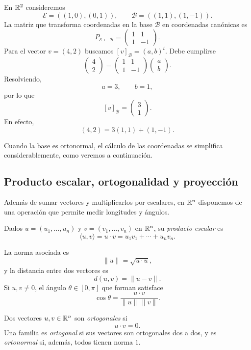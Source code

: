 \begin{example}
En $\mathbb{R}^2$ consideremos
\[
\mathcal E=((1,0),(0,1)),
\qquad
\mathcal B=((1,1),(1,-1)).
\]
La matriz que transforma coordenadas en la base $\mathcal B$ en coordenadas canónicas es
\[
P_{\mathcal E\leftarrow\mathcal B}
=
\begin{pmatrix}
1&1\\
1&-1
\end{pmatrix}.
\]
Para el vector $v=(4,2)$ buscamos $[v]_{\mathcal B}=(a,b)^t$. Debe cumplirse
\[
\begin{pmatrix}4\\2\end{pmatrix}
=
\begin{pmatrix}1&1\\1&-1\end{pmatrix}
\begin{pmatrix}a\\b\end{pmatrix}.
\]
Resolviendo,
\[
a=3,\qquad b=1,
\]
por lo que
\[
\boxed{[v]_{\mathcal B}=\begin{pmatrix}3\\1\end{pmatrix}.}
\]
En efecto,
\[
(4,2)=3(1,1)+(1,-1).
\]
\end{example}

Cuando la base es ortonormal, el cálculo de las coordenadas se simplifica considerablemente, como veremos a continuación.

\subsection{Producto escalar, ortogonalidad y proyección}

Además de sumar vectores y multiplicarlos por escalares, en $\mathbb{R}^n$ disponemos de una operación que permite medir longitudes y ángulos.

\begin{definition}
Dados $u=(u_1,\ldots,u_n)$ y $v=(v_1,\ldots,v_n)$ en $\mathbb{R}^n$, su \emph{producto escalar} es
\[
\langle u,v\rangle
=u\cdot v
=u_1v_1+\cdots+u_nv_n.
\]
\end{definition}

La norma asociada es
\[
\|u\|=\sqrt{u\cdot u},
\]
y la distancia entre dos vectores es
\[
d(u,v)=\|u-v\|.
\]
Si $u,v\neq0$, el ángulo $\theta\in[0,\pi]$ que forman satisface
\[
\cos\theta
=\frac{u\cdot v}{\|u\|\,\|v\|}.
\]

\begin{definition}[Ortogonalidad]
Dos vectores $u,v\in\mathbb{R}^n$ son \emph{ortogonales} si
\[
u\cdot v=0.
\]
Una familia es \emph{ortogonal} si sus vectores son ortogonales dos a dos, y es \emph{ortonormal} si, además, todos tienen norma $1$.
\end{definition}

